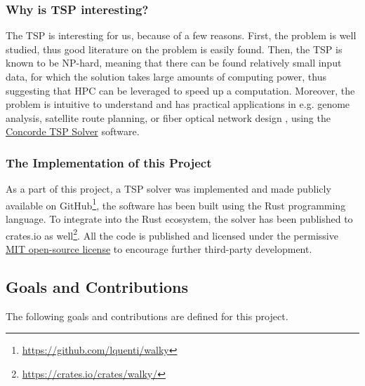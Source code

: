 \subsubsection{Why is TSP interesting?}

The \ac{TSP} is interesting for us, because of a few reasons.
First, the problem is well studied, thus good literature on the problem is easily found.
Then, the \ac{TSP} is known to be NP-hard, meaning that there can be found relatively small
input data, for which the solution takes large amounts of computing power, thus suggesting that \ac{HPC}
can be leveraged to speed up a computation.
Moreover, the problem is intuitive to understand and has practical applications in e.g. genome analysis,
satellite route planning, or fiber optical network design \cite{noauthor_tsp_2007},
using the 
\href{https://en.wikipedia.org/wiki/Concorde_TSP_Solver}{Concorde TSP Solver} software.

\subsubsection{The Implementation of this Project}
As a part of this project, a \ac{TSP} solver was implemented 
and made publicly available on GitHub\footnote{\url{https://github.com/lquenti/walky}},
the software has been built using the Rust programming language. 
To integrate into the Rust ecosystem, 
the solver has been published to crates.io as well\footnote{\url{https://crates.io/crates/walky/}}.
All the code is published and licensed under the permissive
\href{https://github.com/lquenti/walky/blob/main/LICENSE}{MIT open-source license} 
to encourage further third-party development.

\subsection{Goals and Contributions}

The following goals and contributions are defined for this project.

